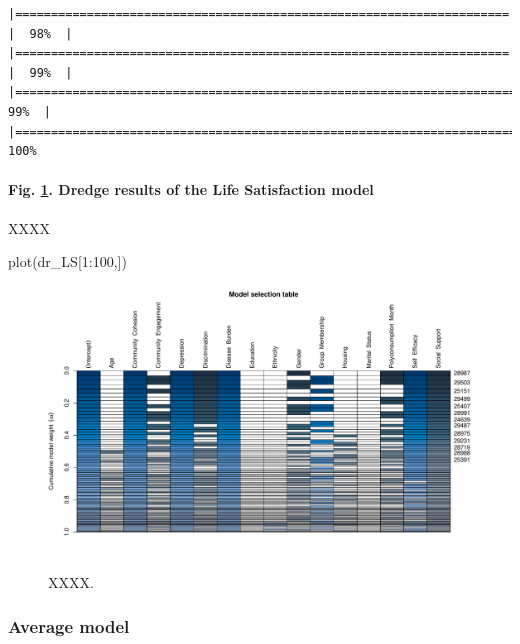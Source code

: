 \documentclass[
  bookmarksnumbered]{article}
\newenvironment{Shaded}{\begin{snugshade}}{\end{snugshade}}
\newcommand{\DecValTok}[1]{\textcolor[rgb]{0.86,0.86,0.80}{#1}}
\newcommand{\FunctionTok}[1]{\textcolor[rgb]{0.94,0.94,0.56}{#1}}
\newcommand{\NormalTok}[1]{\textcolor[rgb]{0.80,0.80,0.80}{#1}}
\newcommand{\SpecialCharTok}[1]{\textcolor[rgb]{0.86,0.64,0.64}{#1}}
\begin{document}
\begin{verbatim}
|===================================================================== |  98%  |                                                                              |===================================================================== |  99%  |                                                                              |======================================================================|  99%  |                                                                              |======================================================================| 100%
\end{verbatim}

\paragraph{Fig. \ref{fig:fig-dredge-LS}. Dredge results of the Life Satisfaction model}\label{fig.-reffigfig-dredge-ls.-dredge-results-of-the-life-satisfaction-model}

XXXX

\begin{Shaded}
\begin{Highlighting}[]
\FunctionTok{plot}\NormalTok{(dr\_LS[}\DecValTok{1}\SpecialCharTok{:}\DecValTok{100}\NormalTok{,])}
\end{Highlighting}
\end{Shaded}

\begin{figure}
\centering
\includegraphics{Supplementary_material_files/figure-latex/fig-dredge-LS-1.pdf}
\caption{\label{fig:fig-dredge-LS}XXXX.}
\end{figure}

\subsubsection{Average model}\label{average-model}
\end{document}
